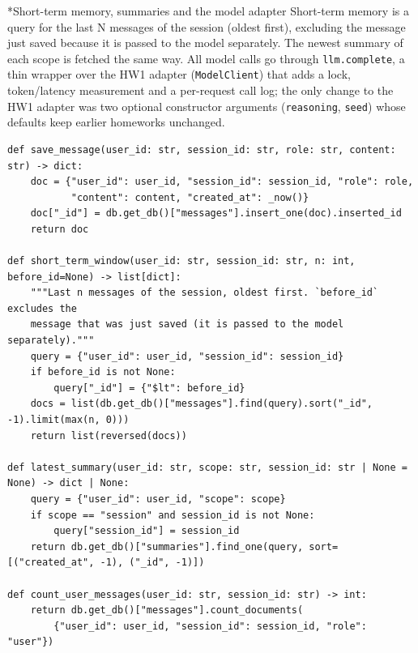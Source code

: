 \documentclass[11pt]{article}
\makeatletter
\renewcommand\subsection{\@startsection{subsection}{2}{\z@}{-2.2ex \@plus -1ex \@minus -.2ex}{0.8ex \@plus.2ex}{\normalfont\fontsize{12}{14.5}\selectfont\bfseries}}
\makeatother
\begin{document}
\subsection*{Short-term memory, summaries and the model adapter}
Short-term memory is a query for the last N messages of the session (oldest first), excluding the message just saved because it is passed to the model separately. The newest summary of each scope is fetched the same way. All model calls go through \verb|llm.complete|, a thin wrapper over the HW1 adapter (\verb|ModelClient|) that adds a lock, token/latency measurement and a per-request call log; the only change to the HW1 adapter was two optional constructor arguments (\verb|reasoning|, \verb|seed|) whose defaults keep earlier homeworks unchanged.

\begingroup\lstset{basicstyle=\ttfamily\scriptsize}
\begin{lstlisting}
def save_message(user_id: str, session_id: str, role: str, content: str) -> dict:
    doc = {"user_id": user_id, "session_id": session_id, "role": role,
           "content": content, "created_at": _now()}
    doc["_id"] = db.get_db()["messages"].insert_one(doc).inserted_id
    return doc

def short_term_window(user_id: str, session_id: str, n: int, before_id=None) -> list[dict]:
    """Last n messages of the session, oldest first. `before_id` excludes the
    message that was just saved (it is passed to the model separately)."""
    query = {"user_id": user_id, "session_id": session_id}
    if before_id is not None:
        query["_id"] = {"$lt": before_id}
    docs = list(db.get_db()["messages"].find(query).sort("_id", -1).limit(max(n, 0)))
    return list(reversed(docs))

def latest_summary(user_id: str, scope: str, session_id: str | None = None) -> dict | None:
    query = {"user_id": user_id, "scope": scope}
    if scope == "session" and session_id is not None:
        query["session_id"] = session_id
    return db.get_db()["summaries"].find_one(query, sort=[("created_at", -1), ("_id", -1)])

def count_user_messages(user_id: str, session_id: str) -> int:
    return db.get_db()["messages"].count_documents(
        {"user_id": user_id, "session_id": session_id, "role": "user"})
\end{lstlisting}
\endgroup
\begingroup\lstset{basicstyle=\ttfamily\scriptsize}
\end{document}
